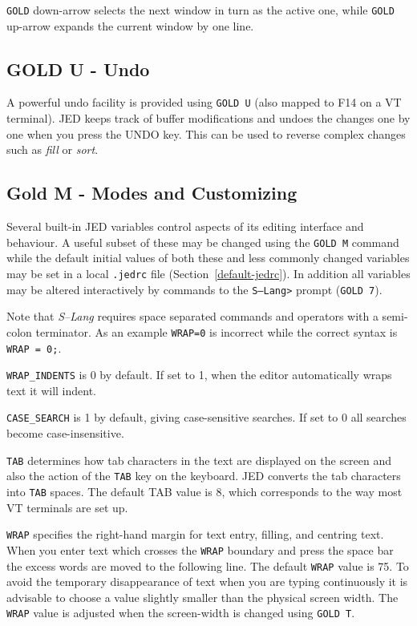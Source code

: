 \documentclass[twoside,11pt]{article}
\newcommand{\xlabel}[1]{}
\begin{document}
\texttt{GOLD} down-arrow selects the next window in turn as the active one,
while \texttt{GOLD} up-arrow expands the current window by one line.

\subsection{\xlabel{gold_u_-_undo}GOLD U - Undo}
\label{gold_u_-_undo}

A powerful undo facility is provided using \texttt{GOLD U} (also mapped to
F14 on a VT terminal).  JED keeps
track of buffer modifications and undoes the changes one by one when you
press the UNDO key.  This can be used to reverse complex changes such as
\emph{fill} or \emph{sort}.

\subsection{\xlabel{modes_and_customizing}Gold M - Modes and Customizing}
\label{modes_and_customizing}
\label{gold-m}

Several built-in JED variables control aspects of its editing
interface and behaviour. A useful subset of these may be changed 
using the \texttt{GOLD M} command while the default initial values 
of both these and less commonly changed variables may be set in a local
\texttt{.jedrc} file (Section~{\ref{default-jedrc}}). In addition
all variables may be altered interactively by commands to the
\texttt{S--Lang>} prompt (\texttt{GOLD 7}).

Note that \textit{S--Lang} requires space separated commands
and operators with a semi-colon terminator. As an example \texttt{WRAP=0} 
is incorrect while the correct syntax is \texttt{WRAP = 0;}. 

\texttt{WRAP\_INDENTS} is 0 by default.  If set to 1, when the editor
automatically wraps text it will indent.

\texttt{CASE\_SEARCH} is 1 by default, giving case-sensitive searches.  
If set to 0 all searches become case-insensitive.

\texttt{TAB} determines how tab characters in the text are displayed on
the screen and also the action of the \texttt{TAB} key on the keyboard. 
JED converts the tab characters into \texttt{TAB} spaces.
The default TAB value is 8, which corresponds to the
way most VT terminals are set up.

\texttt{WRAP} specifies the right-hand margin for text entry, filling, and
centring text. When you enter text which crosses the \texttt{WRAP} boundary
and press the space bar the excess words are moved to the following line.
The default \texttt{WRAP} value is 75.  To avoid the temporary disappearance
of text when you are typing continuously it is advisable to choose a
value slightly smaller than the physical screen width. The \texttt{WRAP}
value is adjusted when the screen-width is changed using \texttt{GOLD T}.
\end{document}
